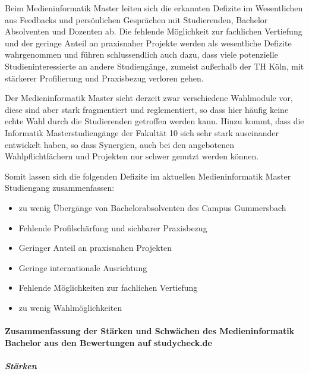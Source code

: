 Beim Medieninformatik Master leiten sich die erkannten Defizite im
Wesentlichen aus Feedbacks und persönlichen Gesprächen mit Studierenden,
Bachelor Absolventen und Dozenten ab. Die fehlende Möglichkeit zur
fachlichen Vertiefung und der geringe Anteil an praxisnaher Projekte
werden als wesentliche Defizite wahrgenommen und führen schlussendlich
auch dazu, dass viele potenzielle Studieninteressierte an andere
Studiengänge, zumeist außerhalb der TH Köln, mit stärkerer Profilierung
und Praxisbezug verloren gehen.

Der Medieninformatik Master sieht derzeit zwar verschiedene Wahlmodule
vor, diese sind aber stark fragmentiert und reglementiert, so dass hier
häufig keine echte Wahl durch die Studierenden getroffen werden kann.
Hinzu kommt, dass die Informatik Masterstudiengänge der Fakultät 10 sich
sehr stark auseinander entwickelt haben, so dass Synergien, auch bei den
angebotenen Wahlpflichtfächern und Projekten nur schwer genutzt werden
können.

Somit lassen sich die folgenden Defizite im aktuellen Medieninformatik
Master Studiengang zusammenfassen:

\begin{itemize}
\tightlist
\item
  zu wenig Übergänge von Bachelorabsolventen des Campus Gummersbach
\item
  Fehlende Profilschärfung und sichbarer Praxisbezug
\item
  Geringer Anteil an praxisnahen Projekten
\item
  Geringe internationale Ausrichtung
\item
  Fehlende Möglichkeiten zur fachlichen Vertiefung
\item
  zu wenig Wahlmöglichkeiten
\end{itemize}

\paragraph{Zusammenfassung der Stärken und Schwächen des
Medieninformatik Bachelor aus den Bewertungen auf
studycheck.de}\label{zusammenfassung-der-stuxe4rken-und-schwuxe4chen-des-medieninformatik-bachelor-aus-den-bewertungen-auf-studycheck.de}

\subparagraph{Stärken}\label{stuxe4rken}

